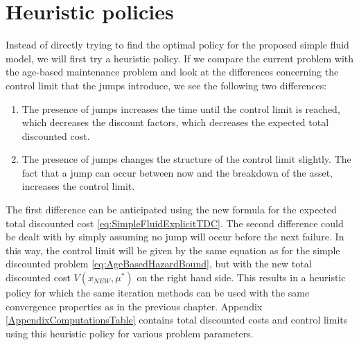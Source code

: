 \section{Heuristic policies}
Instead of directly trying to find the optimal policy for the proposed simple fluid model, we will first try a heuristic policy.
If we compare the current problem with the age-based maintenance problem and look at the differences concerning the control limit that the jumps introduce, we see the following two differences:
\begin{enumerate}
	\item The presence of jumps increases the time until the control limit is reached, which decreases the discount factors, which decreases the expected total discounted cost.
	\item The presence of jumps changes the structure of the control limit slightly.
	The fact that a jump can occur between now and the breakdown of the asset, increases the control limit.
\end{enumerate}
The first difference can be anticipated using the new formula for the expected total discounted cost \eqref{eq:SimpleFluidExplicitTDC}.
The second difference could be dealt with by simply assuming no jump will occur before the next failure.
In this way, the control limit will be given by the same equation as for the simple discounted problem \eqref{eq:AgeBasedHazardBound}, but with the new total discounted cost $V(x_{NEW},\mu^*)$ on the right hand side.
This results in a heuristic policy for which the same iteration methods can be used with the same convergence properties as in the previous chapter.
Appendix \ref{AppendixComputationsTable} contains total discounted costs and control limits using this heuristic policy for various problem parameters.